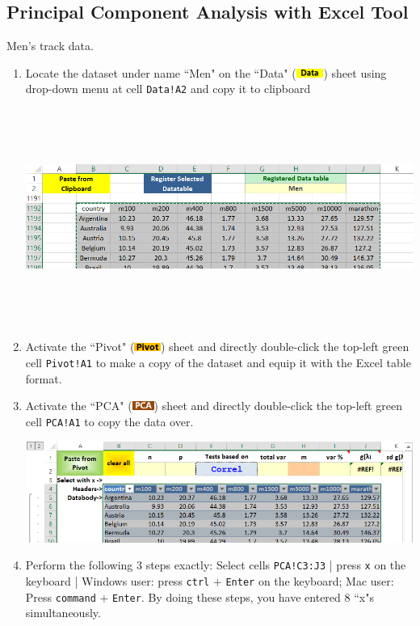 \documentclass[article]{jss}
\newcommand{\shtData}{``Data" (\includegraphics[height=8pt, keepaspectratio=true]{DataSheetTab_png}) }
\newcommand{\shtPivot}{``Pivot" (\includegraphics[height=8pt, keepaspectratio=true]{PivotSheetTab_png}) }
\newcommand{\shtPCA}{``PCA" (\includegraphics[height=8pt, keepaspectratio=true]{PcaSheetTab_png}) }
\begin{document}
        \subsection[egPCA]{Principal Component Analysis with Excel Tool}
        Men's track data.
        \begin{enumerate}
          \item Locate the dataset under name ``Men" on the \shtData sheet using drop-down menu at cell \texttt{Data!A2} and copy it to clipboard
          \begin{center}
            \includegraphics[height=200pt, keepaspectratio=true]{DataSheet_Men_png}
          \end{center}
          \item Activate the \shtPivot sheet and directly double-click the top-left green cell \texttt{Pivot!A1} to make a copy of the dataset and equip it with the Excel table format.
          \item Activate the \shtPCA sheet and directly double-click the top-left green cell \texttt{PCA!A1} to copy the data over.
          \begin{center}
            \includegraphics[width=\linewidth, keepaspectratio=true]{PCASheetAfterPaste_png}
          \end{center}
          \item Perform the following 3 steps exactly: Select cells \texttt{PCA!C3:J3} | press \texttt{x} on the keyboard | Windows user: press \texttt{ctrl} + \texttt{Enter} on the keyboard; Mac user: Press \texttt{command} + \texttt{Enter}. By doing these steps, you have entered 8 ``x"s simultaneously.
        \end{enumerate}
\end{document}
